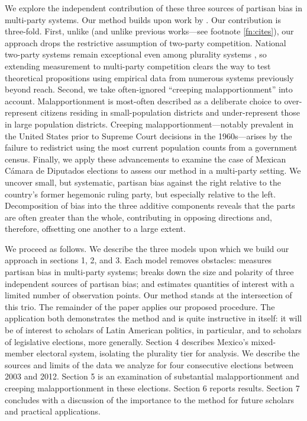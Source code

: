 \documentclass[letter,12pt]{article}
\begin{document}
We explore the independent contribution of these three sources of partisan bias in multi-party systems. Our method builds upon work by \citet{grofman.etalBiasMalapp.1997}. Our contribution is three-fold. First, unlike \citeauthor{grofman.etalBiasMalapp.1997} (and unlike previous works---see footnote \ref{fn:cites}), our approach drops the restrictive assumption of two-party competition. National two-party systems remain exceptional even among plurality systems \citep{cox.1997}, so extending measurement to multi-party competition clears the way to test theoretical propositions using empirical data from numerous systems previously beyond reach. Second, we take often-ignored ``creeping malapportionment'' \citep{johnston.2002} into account. Malapportionment is most-often described as a deliberate choice to over-represent citizens residing in small-population districts and under-represent those in large population districts. Creeping malapportionment---notably prevalent in the United States prior to Supreme Court decisions in the 1960s---arises by the failure to redistrict using the most current population counts from a government census. Finally, we apply these advancements to examine the case of Mexican C\'amara de Diputados elections to assess our method in a multi-party setting. We uncover small, but systematic, partisan bias against the right relative to the country's former hegemonic ruling party, but especially relative to the left. Decomposition of bias into the three additive components reveals that the parts are often greater than the whole, contributing in opposing directions and, therefore, offsetting one another to a large extent. 

We proceed as follows. We describe the three models upon which we build our approach in sections 1, 2, and 3. Each model removes obstacles: \citet{king.1990elRespBiasMultiparty} measures partisan bias in multi-party systems; \citet{grofman.etalBiasMalapp.1997} breaks down the size and polarity of three independent sources of partisan bias; and \citet{linzerSeatVoteElasticity2012} estimates quantities of interest with a limited number of observation points. Our method stands at the intersection of this trio. The remainder of the paper applies our proposed procedure. The application both demonstrates the method and is quite instructive in itself: it will be of interest to scholars of Latin American politics, in particular, and to scholars of legislative elections, more generally. Section 4 describes Mexico's mixed-member electoral system, isolating the plurality tier for analysis. We describe the sources and limits of the data we analyze for four consecutive elections between 2003 and 2012. Section 5 is an examination of substantial malapportionment and creeping malapportionment in these elections. Section 6 reports results. Section 7 concludes with a discussion of the importance to the method for future scholars and practical applications. 
\end{document}
